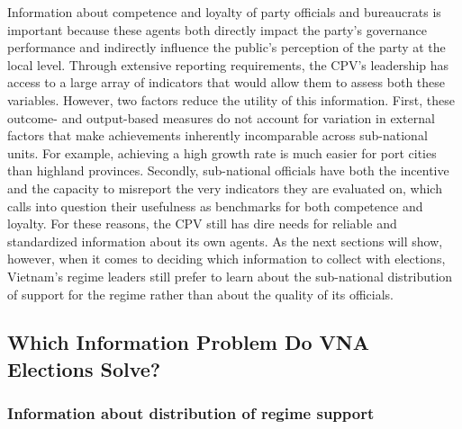 \documentclass[12pt]{article}
\newcommand{\1}{\mathbbm{1}}
\begin{document}
Information about competence and loyalty of party officials and bureaucrats is important because these agents both directly impact the party's governance performance and indirectly influence the public's perception of the party at the local level. Through extensive reporting requirements, the CPV's leadership has access to a large array of indicators that would allow them to assess both these variables. However, two factors reduce the utility of this information. First, these outcome- and output-based measures do not account for variation in external factors that make achievements inherently incomparable across sub-national units. For example, achieving a high growth rate is much easier for port cities than highland provinces. Secondly, sub-national officials have both the incentive and the capacity to misreport the very indicators they are evaluated on, which calls into question their usefulness as benchmarks for both competence and loyalty. For these reasons, the CPV still has dire needs for reliable and standardized information about its own agents. As the next sections will show, however, when it comes to deciding which information to collect with elections, Vietnam's regime leaders still prefer to learn about the sub-national distribution of support for the regime rather than about the quality of its officials.  

\subsection{Which Information Problem Do VNA Elections Solve?}
\label{sec:vietnam_solutions}

\subsubsection{Information about distribution of regime support}
\end{document}
